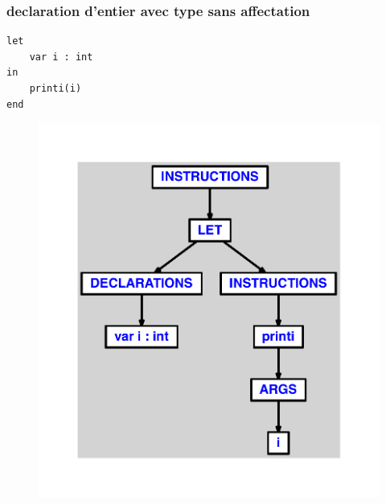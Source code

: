 \documentclass{article}
\begin{document}
\subsubsection{declaration d'entier avec type sans affectation}
\begin{lstlisting}
let
	var i : int
in
	printi(i)
end
\end{lstlisting}
\newpage
\begin{figure}[H]
\centering
\includegraphics[max width=\textwidth]{ast/ast_289.pdf}
\end{figure}
\newpage
\end{document}
